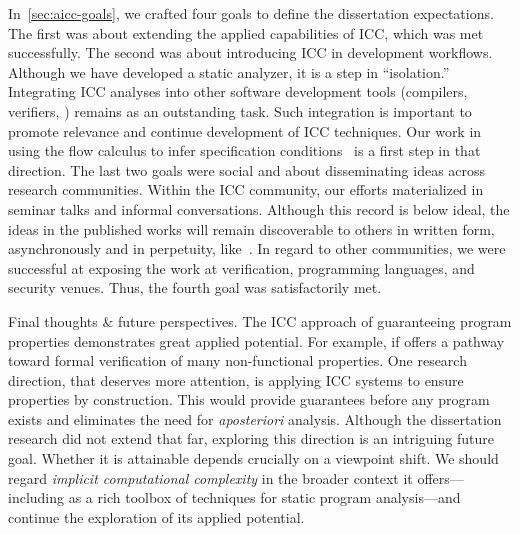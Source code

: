 In~\autoref{sec:aicc-goals}, we crafted four goals to define the dissertation
expectations. The first was about extending the applied capabilities of ICC,
which was met successfully. The second was about introducing ICC in development
workflows. Although we have developed a static analyzer, it is a step in
\enquote{isolation.} Integrating ICC analyses into other software development
tools (compilers, verifiers, \etc) remains as an outstanding task. Such
integration is important to promote relevance and continue development of ICC
techniques. Our work in using the flow calculus to infer
specification conditions~\cite{rusch2025} is a first step
in that direction. The last two goals were social and about disseminating ideas
across research communities. Within the ICC community, our efforts materialized
in seminar talks and informal conversations. Although this record is below
ideal, the ideas in the published works will remain discoverable to others in
written form, asynchronously and in perpetuity, like~\cite{moyen2017}. In regard
to other communities, we were successful at exposing the work at verification,
programming languages, and security venues. Thus, the fourth goal was
satisfactorily met.

{Final thoughts \& future perspectives.} The ICC approach of guaranteeing
program properties demonstrates great applied potential. For example, if offers
a pathway toward formal verification of many non-functional
properties. One research direction, that deserves
more attention, is applying ICC systems to ensure properties by construction.
This would provide guarantees before any program exists and eliminates the need
for \emph{aposteriori} analysis. Although the dissertation research did not
extend that far, exploring this direction is an intriguing future goal. Whether
it is attainable depends crucially on a viewpoint shift. We should regard
\emph{implicit computational complexity} in the broader context it
offers---including as a rich toolbox of techniques for static program
analysis---and continue the exploration of its
applied potential.

